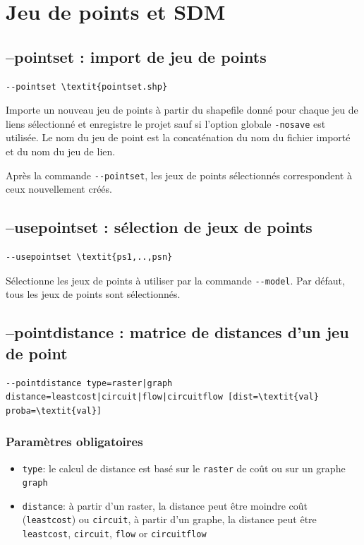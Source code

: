 \documentclass[a4paper,10pt]{report}
\begin{document}
\section{Jeu de points et SDM}
\subsection{--pointset : import de jeu de points}
\begin{Verbatim}[commandchars=\\\{\}]
--pointset \textit{pointset.shp}
\end{Verbatim}
Importe un nouveau jeu de points à partir du shapefile donné pour chaque jeu de liens sélectionné et enregistre le projet sauf si l'option globale \verb|-nosave| est utilisée.
Le nom du jeu de point est la concaténation du nom du fichier importé et du nom du jeu de lien.

Après la commande \verb|--pointset|, les jeux de points sélectionnés correspondent à ceux nouvellement créés.

\subsection{--usepointset : sélection de jeux de points}
\begin{Verbatim}[commandchars=\\\{\}]
--usepointset \textit{ps1,..,psn}
\end{Verbatim}
Sélectionne les jeux de points à utiliser par la commande \verb|--model|.
Par défaut, tous les jeux de points sont sélectionnés.

\subsection{--pointdistance : matrice de distances d'un jeu de point}
\begin{Verbatim}[commandchars=\\\{\}]
--pointdistance type=raster|graph distance=leastcost|circuit|flow|circuitflow [dist=\textit{val} proba=\textit{val}]
\end{Verbatim}

\subsubsection{Paramètres obligatoires}
\begin{itemize}
	\item \verb|type|: le calcul de distance est basé sur le \verb|raster| de coût ou sur un graphe \verb|graph|
	\item \verb|distance|: à partir d'un raster, la distance peut être moindre coût (\verb|leastcost|) ou \verb|circuit|, à partir d'un graphe, la distance peut être \verb|leastcost|, \verb|circuit|, \verb|flow| or \verb|circuitflow|
\end{itemize}
\end{document}
